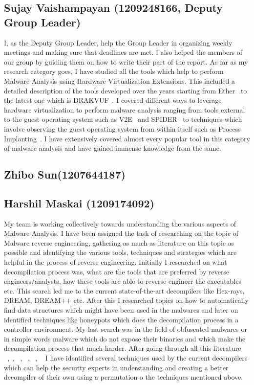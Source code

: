 \documentclass[11pt]{article}
\begin{document}
\subsection{Sujay Vaishampayan (1209248166, Deputy Group Leader)}
I, as the Deputy Group Leader, help the Group Leader in organizing weekly meetings and making sure that deadlines are met. I also helped the members of our group by guiding them on how to write their part of the report. As far as my research category goes, I have studied all the tools which help to perform Malware Analysis using Hardware Virtualization Extensions. This included a detailed description of the tools developed over the years starting from Ether~\cite{dinaburg2008ether} to the latest one which is DRAKVUF~\cite{lengyel2014scalability}. I covered different ways to leverage hardware virtualization to perform malware analysis ranging from tools external to the guest operating system such as V2E~\cite{yan2012v2e} and SPIDER~\cite{dongyan2013spider} to techniques which involve observing the guest operating system from within itself such as Process Implanting~\cite{jiang2011procimplant}. I have extensively covered almost every popular tool in this category of malware analysis and have gained immense knowledge from the same.


\subsection{Zhibo Sun(1207644187)}

\subsection{Harshil Maskai (1209174092)}
My team is working collectively towards understanding the various aspects of Malware Analysis. I have been assigned the task of researching on the topic of Malware reverse engineering, gathering as much as literature on this topic as possible and identifying the various tools, techniques and strategies which are helpful in the process of reverse engineering. Initially I researched on what decompilation process was, what are the tools that are preferred by reverse engineers/analysts, how these tools are able to reverse engineer the executables etc. This search led me to the current state-of-the-art decompilers like Hex-rays, DREAM, DREAM++ etc. After this I researched topics on how to automatically find data structures which might have been used in the malwares and later on identified techniques like honeypots which does the decompilation process in a controller environment. My last search was in the field of obfuscated malwares or in simple words malware which do not expose their binaries and which make the decompilation process that much harder.
After going through all this literature ~\cite{yakdan2016helping},~\cite{guilfanov2008decompilers}, ~\cite{yakdan2015no}, ~\cite{lin2010automatic}, ~\cite{honeypot2016}, ~\cite{rotalumegatech} I have identified several techniques used by the current decompilers which can help the security experts in understanding and creating a better decompiler of their own using a permutation o the techniques mentioned above.
\end{document}
